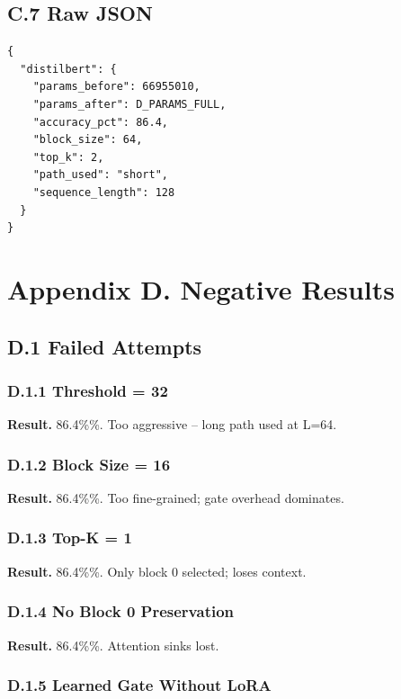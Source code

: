 \subsection{C.7 Raw JSON}

\begin{lstlisting}
{
  "distilbert": {
    "params_before": 66955010,
    "params_after": D_PARAMS_FULL,
    "accuracy_pct": 86.4,
    "block_size": 64,
    "top_k": 2,
    "path_used": "short",
    "sequence_length": 128
  }
}
\end{lstlisting}



\section{Appendix D. Negative Results}

\subsection{D.1 Failed Attempts}

\subsubsection{D.1.1 Threshold = 32}

\textbf{Result.} 86.4\%\%. Too aggressive -- long path used at L=64.

\subsubsection{D.1.2 Block Size = 16}

\textbf{Result.} 86.4\%\%. Too fine-grained; gate overhead dominates.

\subsubsection{D.1.3 Top-K = 1}

\textbf{Result.} 86.4\%\%. Only block 0 selected; loses context.

\subsubsection{D.1.4 No Block 0 Preservation}

\textbf{Result.} 86.4\%\%. Attention sinks lost.

\subsubsection{D.1.5 Learned Gate Without LoRA}

